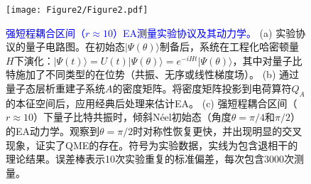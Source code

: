 \documentclass[11pt,a4paper]{article}
\begin{document}
\begin{figure}[H]
    \centering
    \texttt{[image: Figure2/Figure2.pdf]}
    \caption{
        \textcolor{blue}{强短程耦合区间（$r\approx 10$）EA测量实验协议及其动力学。}
        (a) 实验协议的量子电路图。在初始态$|\Psi(\theta)\rangle$制备后，系统在工程化哈密顿量$H$下演化：$|\Psi(t)\rangle = U(t)|\Psi(\theta)\rangle = e^{-iHt}|\Psi(\theta)\rangle$，其中对量子比特施加了不同类型的在位势（共振、无序或线性梯度场）。
        (b) 通过量子态层析重建子系统$A$的密度矩阵。将密度矩阵投影到电荷算符$Q_A$的本征空间后，应用经典后处理来估计EA。
        (c) 强短程耦合区间（$r\approx 10$）下量子比特共振时，倾斜Néel初始态（角度$\theta=\pi/4$和$\pi/2$）的EA动力学。观察到$\theta=\pi/2$时对称性恢复更快，并出现明显的交叉现象，证实了QME的存在。符号为实验数据，实线为包含退相干的理论结果。误差棒表示10次实验重复的标准偏差，每次包含3000次测量。
    }
    \label{fig:EA_measurement_strong_coupling}
\end{figure}
\end{document}
